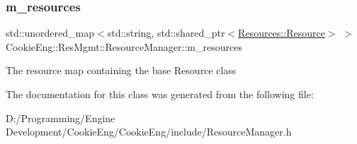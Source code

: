 \subsubsection{\texorpdfstring{m\+\_\+resources}{m\_resources}}
{\footnotesize\ttfamily std\+::unordered\+\_\+map$<$std\+::string, std\+::shared\+\_\+ptr$<$\hyperlink{class_cookie_eng_1_1_resources_1_1_resource}{Resources\+::\+Resource}$>$ $>$ Cookie\+Eng\+::\+Res\+Mgmt\+::\+Resource\+Manager\+::m\+\_\+resources\hspace{0.3cm}{\ttfamily [protected]}}

The resource map containing the base Resource class 

The documentation for this class was generated from the following file\+:\begin{DoxyCompactItemize}
\item 
D\+:/\+Programming/\+Engine Development/\+Cookie\+Eng/\+Cookie\+Eng/include/Resource\+Manager.\+h\end{DoxyCompactItemize}
